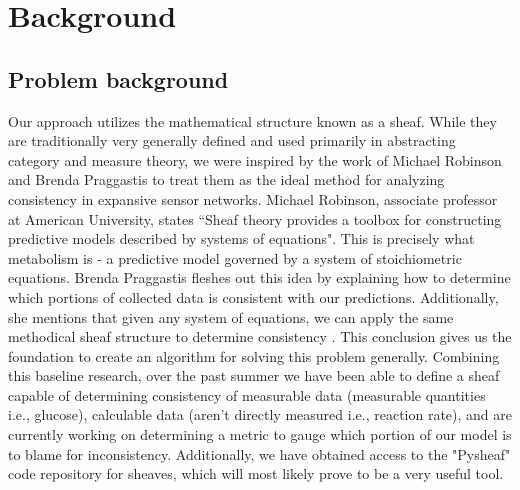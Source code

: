 \documentclass[12pt]{article}
\begin{document}


\section{Background}
\subsection{Problem background}
Our approach utilizes the mathematical structure known as a sheaf. While they are traditionally very generally defined and used primarily in abstracting category and measure theory, we were inspired by the work of Michael Robinson and Brenda Praggastis to treat them as the ideal method for analyzing consistency in expansive sensor networks. Michael Robinson,  associate professor at American University, states ``Sheaf theory
provides a toolbox for constructing predictive models described by systems of
equations"\cite{mr}. This is precisely what metabolism is - a predictive model governed by a system of stoichiometric equations. Brenda Praggastis fleshes out this idea by explaining how to determine which portions of collected data is consistent with our predictions. Additionally, she mentions that given any system of equations, we can apply the same methodical sheaf structure to determine consistency \cite{pr}. This conclusion gives us the foundation to create an algorithm for solving this problem generally. Combining this baseline research, over the past summer we have been able to define a sheaf capable of determining consistency of measurable data (measurable quantities i.e., glucose), calculable data (aren't directly measured i.e., reaction rate), and are currently working on determining a metric to gauge which portion of our model is to blame for inconsistency. Additionally, we have obtained access to the "Pysheaf" code repository for sheaves, which will most likely
prove to be a very useful tool.
\end{document}
